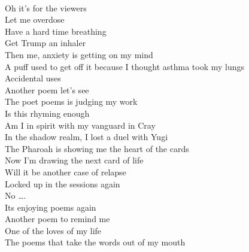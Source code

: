 \documentclass[12pt, b5paper, oneside]{book}
\begin{document}
\\Oh it's for the viewers
\\Let me overdose
\\Have a hard time breathing
\\Get Trump an inhaler
\\Then me, anxiety is getting on my mind
\\A puff used to get off it because I thought asthma took my lungs
\\Accidental uses
\\Another poem let's see
\\The poet poems is judging my work
\\Is this rhyming enough
\\Am I in spirit with my vanguard in Cray
\\In the shadow realm, I lost a duel with Yugi
\\The Pharoah is showing me the heart of the cards
\\Now I'm drawing the next card of life
\\Will it be another case of relapse
\\Locked up in the sessions again
\\No \dots .
\\Its enjoying poems again
\\Another poem to remind me
\\One of the loves of my life
\\The poems that take the words out of my mouth 
\newpage
\end{document}
